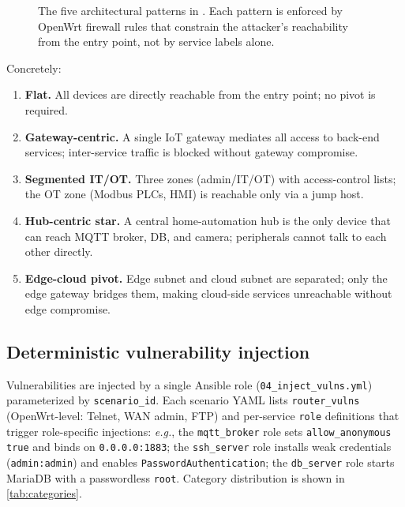 \begin{figure}[t]
  \centering
  \caption{The five architectural patterns in \systemname. Each pattern is enforced
  by OpenWrt firewall rules that constrain the attacker's reachability from the
  entry point, not by service labels alone.}
  \label{fig:patterns}
\end{figure}


Concretely:
\begin{enumerate}
  \item \textbf{Flat.} All devices are directly reachable from the entry point;
  no pivot is required.
  \item \textbf{Gateway-centric.} A single IoT gateway mediates all access to
  back-end services; inter-service traffic is blocked without gateway compromise.
  \item \textbf{Segmented IT/OT.} Three zones (admin/IT/OT) with access-control
  lists; the OT zone (Modbus PLCs, HMI) is reachable only via a jump host.
  \item \textbf{Hub-centric star.} A central home-automation hub is the only
  device that can reach MQTT broker, DB, and camera; peripherals cannot talk
  to each other directly.
  \item \textbf{Edge-cloud pivot.} Edge subnet and cloud subnet are separated;
  only the edge gateway bridges them, making cloud-side services unreachable
  without edge compromise.
\end{enumerate}

\subsection{Deterministic vulnerability injection}
\label{sec:iotbench:inject}

Vulnerabilities are injected by a single Ansible role (\texttt{04\_inject\_vulns.yml})
parameterized by \texttt{scenario\_id}. Each scenario YAML lists \texttt{router\_vulns}
(OpenWrt-level: Telnet, WAN admin, FTP) and per-service \texttt{role} definitions
that trigger role-specific injections: \emph{e.g.}, the \texttt{mqtt\_broker} role
sets \texttt{allow\_anonymous true} and binds on \texttt{0.0.0.0:1883}; the
\texttt{ssh\_server} role installs weak credentials (\texttt{admin:admin}) and
enables \texttt{PasswordAuthentication}; the \texttt{db\_server} role starts
MariaDB with a passwordless \texttt{root}. Category distribution is shown in
\cref{tab:categories}.

